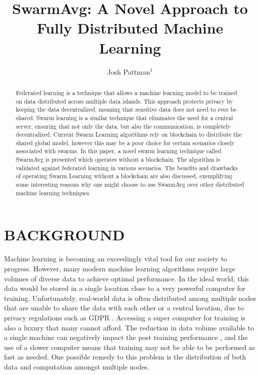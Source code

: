 \documentclass[letterpaper, 10 pt, conference]{ieeeconf}  %
\title{\LARGE \bf SwarmAvg: A Novel Approach to Fully Distributed Machine Learning}
\author{Josh Pattman$^{1}$%
}
\begin{document}
\maketitle
\thispagestyle{empty}
\pagestyle{empty}


\begin{abstract}

Federated learning is a technique that allows a machine learning model to be trained on data distributed across multiple data islands. This approach protects privacy by keeping the data decentralized, meaning that sensitive data does not need to ever be shared. Swarm learning is a similar technique that eliminates the need for a central server, ensuring that not only the data, but also the communication, is completely decentralized. Current Swarm Learning algorithms rely on blockchain to distribute the shared global model, however this may be a poor choice for certain scenarios closely associated with swarms. In this paper, a novel swarm learning technique called SwarmAvg is presented which operates without a blockchain. The algorithm is validated against federated learning in various scenarios. The benefits and drawbacks of operating Swarm Learning without a blockchain are also discussed, exemplifying some interesting reasons why one might choose to use SwarmAvg over other distributed machine learning techniques.

\end{abstract}


\section{BACKGROUND}

Machine learning is becoming an exceedingly vital tool for our society to progress. However, many modern machine learning algorithms require large volumes of diverse data to achieve optimal performance. In the ideal world, this data would be stored in a single location close to a very powerful computer for training. Unfortunately, real-world data is often distributed among multiple nodes that are unable to share the data with each other or a central location, due to privacy regulations such as GDPR \cite{gdpr}. Accessing a super computer for training is also a luxury that many cannot afford. The reduction in data volume available to a single machine can negatively impact the post training performance \cite{data_volume}, and the use of a slower computer means that training may not be able to be performed as fast as needed. One possible remedy to this problem is the distribution of both data and computation amongst multiple nodes.
\end{document}

